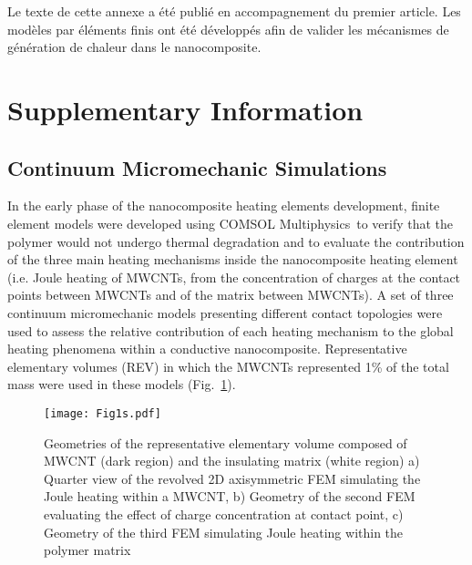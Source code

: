 \label{sec:Annexe_B}

Le texte de cette annexe a été publié en accompagnement du premier article. 
Les modèles par éléments finis ont été développés afin de valider les mécanismes de génération de chaleur dans le nanocomposite. 

\section{Supplementary Information}

\subsection{Continuum Micromechanic Simulations}

In the early phase of the nanocomposite heating elements development, finite element models were developed using COMSOL Mul\-ti\-phy\-sics\-\textregistered \ to verify that the polymer would not undergo thermal degradation and to evaluate the contribution of the three main heating mechanisms inside the nanocomposite heating element (i.e. Joule heating of MWCNTs, from the concentration of charges at the contact points between MWCNTs and of the matrix between MWCNTs).  
A set of three continuum micromechanic models presenting different contact topologies were used to assess the relative contribution of each heating mechanism to the global heating phenomena within a conductive nanocomposite. 
Representative elementary volumes (REV) in which the MWCNTs represented 1\% of the total mass were used in these models (Fig.~\ref{fig:geometry}). 

\begin{figure}[htb]
	\centering
	\texttt{[image: Fig1s.pdf]}
	\caption{Geometries of the representative elementary volume composed of MWCNT (dark region) and the insulating matrix (white region) a) Quarter view of the revolved 2D axisymmetric FEM simulating the Joule heating within a MWCNT, b) Geometry of the second FEM evaluating the effect of charge concentration at contact point, c) Geometry of the third FEM simulating Joule heating within the polymer matrix \cite{Brassard2018_figshare_article1}}
	\label{fig:geometry}
\end{figure}

